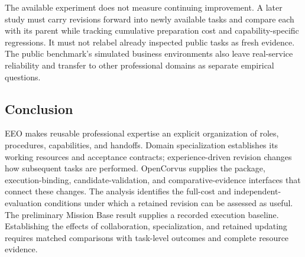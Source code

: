 The available experiment does not measure continuing improvement. A later study must carry revisions forward into newly available tasks and compare each with its parent while tracking cumulative preparation cost and capability-specific regressions. It must not relabel already inspected public tasks as fresh evidence. The public benchmark's simulated business environments also leave real-service reliability and transfer to other professional domains as separate empirical questions.

\subsection{Conclusion}
EEO makes reusable professional expertise an explicit organization of roles, procedures, capabilities, and handoffs. Domain specialization establishes its working resources and acceptance contracts; experience-driven revision changes how subsequent tasks are performed. OpenCorvus supplies the package, execution-binding, candidate-validation, and comparative-evidence interfaces that connect these changes. The analysis identifies the full-cost and independent-evaluation conditions under which a retained revision can be assessed as useful. The preliminary Mission Base result supplies a recorded execution baseline. Establishing the effects of collaboration, specialization, and retained updating requires matched comparisons with task-level outcomes and complete resource evidence.
